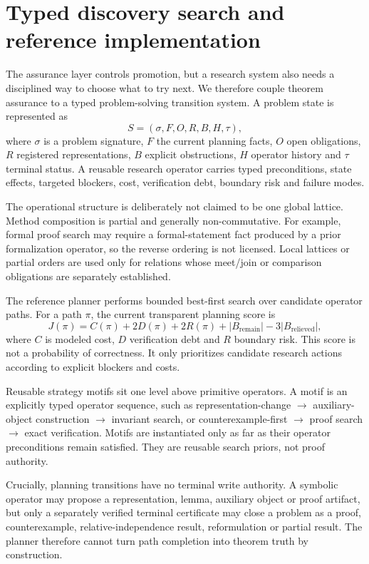 \section{Typed discovery search and reference implementation}

The assurance layer controls promotion, but a research system also needs a disciplined way to choose what to try next. We therefore couple theorem assurance to a typed problem-solving transition system. A problem state is represented as
\[
S=(\sigma,F,O,R,B,H,\tau),
\]
where $\sigma$ is a problem signature, $F$ the current planning facts, $O$ open obligations, $R$ registered representations, $B$ explicit obstructions, $H$ operator history and $\tau$ terminal status. A reusable research operator carries typed preconditions, state effects, targeted blockers, cost, verification debt, boundary risk and failure modes.

The operational structure is deliberately not claimed to be one global lattice. Method composition is partial and generally non-commutative. For example, formal proof search may require a formal-statement fact produced by a prior formalization operator, so the reverse ordering is not licensed. Local lattices or partial orders are used only for relations whose meet/join or comparison obligations are separately established.

The reference planner performs bounded best-first search over candidate operator paths. For a path $\pi$, the current transparent planning score is
\[
J(\pi)=C(\pi)+2D(\pi)+2R(\pi)+|B_{\mathrm{remain}}|-3|B_{\mathrm{relieved}}|,
\]
where $C$ is modeled cost, $D$ verification debt and $R$ boundary risk. This score is not a probability of correctness. It only prioritizes candidate research actions according to explicit blockers and costs.

Reusable strategy motifs sit one level above primitive operators. A motif is an explicitly typed operator sequence, such as representation-change $\rightarrow$ auxiliary-object construction $\rightarrow$ invariant search, or counterexample-first $\rightarrow$ proof search $\rightarrow$ exact verification. Motifs are instantiated only as far as their operator preconditions remain satisfied. They are reusable search priors, not proof authority.

Crucially, planning transitions have no terminal write authority. A symbolic operator may propose a representation, lemma, auxiliary object or proof artifact, but only a separately verified terminal certificate may close a problem as a proof, counterexample, relative-independence result, reformulation or partial result. The planner therefore cannot turn path completion into theorem truth by construction.

